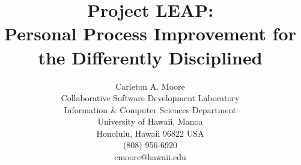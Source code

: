 



\title{Project LEAP:\\
Personal Process Improvement for the Differently Disciplined}
\author{
        \hspace*{-2ex}
        \parbox{4.0in} {\begin{center}
        {\authornamefont Carleton A. Moore}\\ 
        Collaborative Software Development Laboratory\\
        Information \& Computer Sciences Department\\
        University of Hawaii, Manoa\\
        Honolulu, Hawaii 96822  USA \\
        (808) 956-6920\\
        cmoore@hawaii.edu
        \end{center} }}
\maketitle
\copyrightspace


